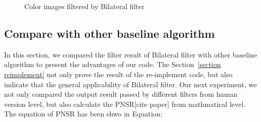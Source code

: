 \documentclass[12pt]{article}
\begin{document}
\begin{figure}[H]
{  }
  \quad
  \quad
  \quad
  \quad
  \caption{Color images filtered by Bilateral filter}
\end{figure}


\subsection{Compare with other baseline algorithm}
\label{baseline comparison}
In this section, we compared the filter result of Bilateral filter with other baseline algorithm to present the advantages of our code.
The Section~\ref{section reimplement} not only prove the result of the re-implement code, but also indicate that the general applicability of Bilateral filter.
Our next experiment, we not only compared the output result passed by different filters from human version level, but also calculate the PNSR[cite paper] from mathmatical level. 
The equation of PNSR has been shwo in Equation:
\end{document}
